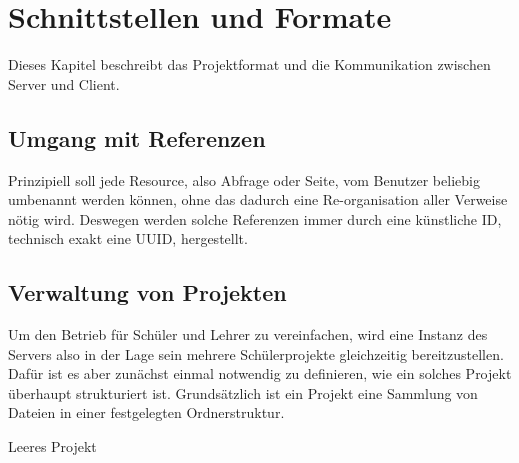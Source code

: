 \section{Schnittstellen und Formate}

Dieses Kapitel beschreibt das Projektformat und die Kommunikation zwischen Server und Client.

\subsection{Umgang mit Referenzen}

Prinzipiell soll jede Resource, also Abfrage oder Seite, vom Benutzer beliebig umbenannt werden können, ohne das dadurch eine Re-organisation aller Verweise nötig wird. Deswegen werden solche Referenzen immer durch eine künstliche ID, technisch exakt eine UUID, hergestellt.

\subsection{Verwaltung von Projekten}

Um den Betrieb für Schüler und Lehrer zu vereinfachen, wird eine Instanz des Servers also in der Lage sein mehrere Schülerprojekte gleichzeitig bereitzustellen. Dafür ist es aber zunächst einmal notwendig zu definieren, wie ein solches Projekt überhaupt strukturiert ist. Grundsätzlich ist ein Projekt eine Sammlung von Dateien in einer festgelegten Ordnerstruktur.

\begin{dirstruct}
  \caption{Leeres Projekt}
\end{dirstruct}




